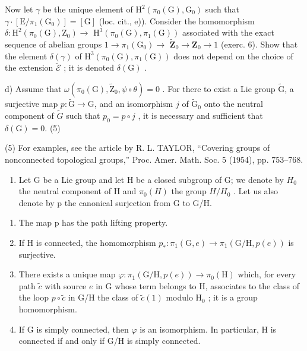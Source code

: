 Now let \(\gamma\) be the unique element of \(\mathrm{H}^2 (\pi_0(\mathrm{G}),\mathrm{G}_0)\) such that \(\gamma \cdot [\mathrm{E} / \pi_1(\mathrm{G}_0)] = [\mathrm{G}]\) (loc. cit., e)). Consider the homomorphism \(\delta \colon \mathrm{H}^2 (\pi_0(\mathrm{G}),\mathrm{Z}_0)\to\) \(\mathrm{H}^3 (\pi_0(\mathrm{G}),\pi_1(\mathrm{G}))\) associated with the exact sequence of abelian groups \(1\to \pi_1(\mathrm{G}_0)\to\) \(\widetilde{\mathbf{Z}}_0\to \mathbf{Z}_0\to 1\) (exerc. 6). Show that the element \(\delta (\gamma)\) of \(\mathrm{H}^3 (\pi_0(\mathrm{G}),\pi_1(\mathrm{G}))\) does not depend on the choice of the extension \(\widetilde{\mathcal{E}}\) ; it is denoted \(\delta (\mathrm{G})\) .

d) Assume that \(\omega (\pi_0(\mathrm{G}),\widetilde{\mathrm{Z}}_0,\psi \circ \theta) = 0\) . For there to exist a Lie group \(\widetilde{\mathrm{G}}\), a surjective map \(p\colon \widetilde{\mathrm{G}}\to \mathrm{G}\), and an isomorphism \(j\) of \(\widetilde{\mathrm{G}}_0\) onto the neutral component of \(\widetilde{G}\) such that \(p_{0}=p\circ j\) , it is necessary and sufficient that \(\delta(\mathrm{G})=0.\) (5)

(5) For examples, see the article by R. L. TAYLOR, “Covering groups of nonconnected topological groups,” Proc. Amer. Math. Soc. 5 (1954), pp. 753–768.

\begin{enumerate}
\def\labelenumi{\arabic{enumi})}
\setcounter{enumi}{7}
\tightlist
\item
  Let G be a Lie group and let H be a closed subgroup of G; we denote by \(H_{0}\) the neutral component of H and \(\pi_{0}(H)\) the group \(H/H_{0}\) . Let us also denote by p the canonical surjection from G to G/H.
\end{enumerate}

\begin{enumerate}
\def\labelenumi{\alph{enumi})}
\item
  The map p has the path lifting property.
\item
  If H is connected, the homomorphism \(p_{*}\colon\pi_{1}(\mathrm{G},e)\to\pi_{1}(\mathrm{G}/\mathrm{H},p(e))\) is surjective.
\item
  There exists a unique map \(\varphi\colon\pi_{1}(\mathrm{G/H},p(e))\to\pi_{0}(\mathrm{H})\) which, for every path \(\widetilde{c}\) with source \(e\) in G whose term belongs to H, associates to the class of the loop \(p\circ\widetilde{c}\) in G/H the class of \(\widetilde{c}(1)\) modulo \(\mathrm{H}_{0}\) ; it is a group homomorphism.
\item
  If G is simply connected, then \(\varphi\) is an isomorphism. In particular, H is connected if and only if G/H is simply connected.
\end{enumerate}

